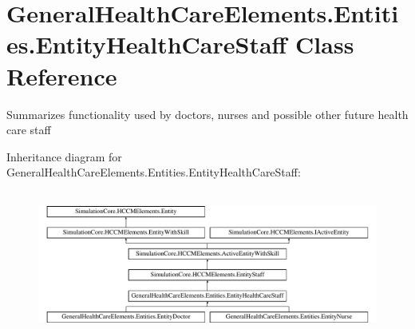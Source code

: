 \hypertarget{class_general_health_care_elements_1_1_entities_1_1_entity_health_care_staff}{}\section{General\+Health\+Care\+Elements.\+Entities.\+Entity\+Health\+Care\+Staff Class Reference}
\label{class_general_health_care_elements_1_1_entities_1_1_entity_health_care_staff}


Summarizes functionality used by doctors, nurses and possible other future health care staff  


Inheritance diagram for General\+Health\+Care\+Elements.\+Entities.\+Entity\+Health\+Care\+Staff\+:\begin{figure}[H]
\begin{center}
\leavevmode
\includegraphics[height=4.827586cm]{class_general_health_care_elements_1_1_entities_1_1_entity_health_care_staff}
\end{center}
\end{figure}
